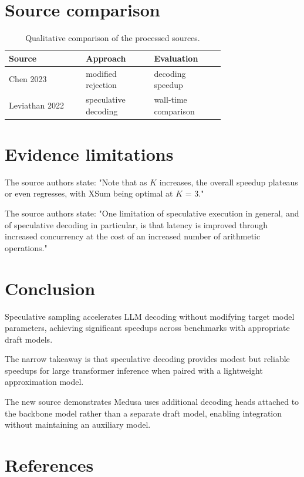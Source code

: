 \documentclass{article}\usepackage{amsmath,amssymb,graphicx,url}
\begin{document}
\section{Source comparison}
\begin{table}[H]\centering
\begin{tabular}{|>{\raggedright\arraybackslash}p{0.26\linewidth}|>{\raggedright\arraybackslash}p{0.235\linewidth}|>{\raggedright\arraybackslash}p{0.235\linewidth}|}\hline
Source & Approach & Evaluation \\ \hline
Chen 2023 \cite{chen2023accelerating} & modified rejection & decoding speedup \\ \hline
Leviathan 2022 \cite{leviathan2022fast} & speculative decoding & wall-time comparison \\ \hline
\end{tabular}\caption{Qualitative comparison of the processed sources.}\end{table}
\section{Evidence limitations}
The source authors state: "Note that as \ensuremath{\mathit{K}}
increases, the overall speedup plateaus or even regresses, with XSum being optimal at \ensuremath{\mathit{K}} = 3." \cite{chen2023accelerating}

The source authors state: "One limitation of speculative execution in general, and of
speculative decoding in particular, is that latency is improved through increased concurrency at the cost of an increased number of arithmetic operations." \cite{leviathan2022fast}

\section{Conclusion}
Speculative sampling accelerates LLM decoding without modifying target model parameters, achieving significant speedups across benchmarks with appropriate draft models. \cite{chen2023accelerating}

The narrow takeaway is that speculative decoding provides modest but reliable speedups for large transformer inference when paired with a lightweight approximation model. \cite{leviathan2022fast}

The new source demonstrates Medusa uses additional decoding heads attached to the backbone model rather than a separate draft model, enabling integration without maintaining an auxiliary model. \cite{cai2024medusa}




\section*{References}
\end{document}
